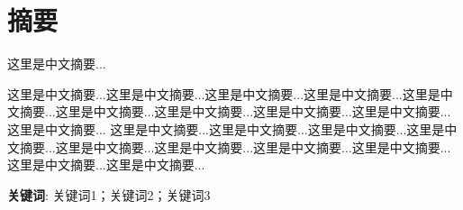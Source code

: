 \section*{ 摘要}
这里是中文摘要...

这里是中文摘要...这里是中文摘要...这里是中文摘要...这里是中文摘要...这里是中文摘要...这里是中文摘要...这里是中文摘要...这里是中文摘要...这里是中文摘要...这里是中文摘要...
这里是中文摘要...这里是中文摘要...这里是中文摘要...这里是中文摘要...这里是中文摘要...这里是中文摘要...这里是中文摘要...这里是中文摘要...这里是中文摘要...这里是中文摘要...

\noindent
\textbf{关键词}:
关键词1；关键词2；关键词3
\indent
